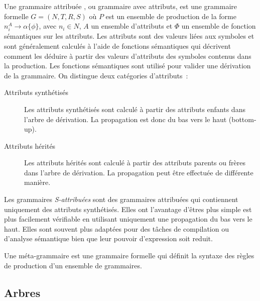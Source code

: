 \begin{definition}
    Une grammaire attribuée \cite{knuthSemanticsContextfreeLanguages1968}, ou grammaire avec attributs, est une grammaire formelle $G = (N, T, R, S)$ où $P$ est un ensemble de production de la forme $n_i^A \to \alpha \{\phi\}$, avec $n_i \in N$, $A$ un ensemble d'attributs et $\Phi$ un ensemble de fonction sémantiques sur les attributs.
    Les attributs sont des valeurs liées aux symboles et sont généralement calculés à l'aide de fonctions sémantiques qui décrivent comment les déduire à partir des valeurs d'attributs des symboles contenus dans la production.
    Les fonctions sémantiques sont utilisé pour valider une dérivation de la grammaire.
    On distingue deux catégories d'attributs :
    \begin{description}
        \item[Attributs synthétisés] Les attributs synthétisés sont calculé à partir des attributs enfants dans l'arbre de dérivation.
              La propagation est donc du bas vers le haut (bottom-up).
        \item[Attributs hérités] Les attributs hérités sont calculé à partir des attributs parents ou frères dans l'arbre de dérivation.
              La propagation peut être effectuée de différente manière.
    \end{description}

    Les grammaires \emph{S-attribuées} sont des grammaires attribuées qui contiennent uniquement des attributs synthétisés.
    Elles ont l'avantage d'êtres plus simple est plus facilement vérifiable en utilisant uniquement une propagation du bas vers le haut.
    Elles sont souvent plus adaptées pour des tâches de compilation ou d'analyse sémantique bien que leur pouvoir d'expression soit reduit.
\end{definition}

\begin{definition}
    Une méta-grammaire est une grammaire formelle qui définit la syntaxe des règles de production d'un ensemble de grammaires.
\end{definition}

\subsection{Arbres}

